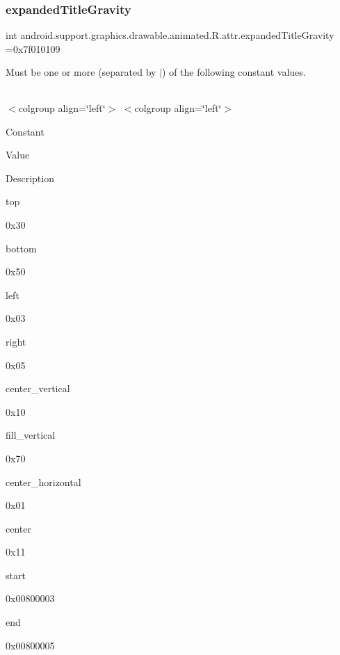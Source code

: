 \subsubsection{\texorpdfstring{expanded\+Title\+Gravity}{expandedTitleGravity}}
{\footnotesize\ttfamily int android.\+support.\+graphics.\+drawable.\+animated.\+R.\+attr.\+expanded\+Title\+Gravity =0x7f010109\hspace{0.3cm}{\ttfamily [static]}}

Must be one or more (separated by \textquotesingle{}$\vert$\textquotesingle{}) of the following constant values.

\tabulinesep=1mm
\begin{longtabu} spread 0pt [c]{*{0}{|X[-1]}|}
\hline
\end{longtabu}
$<$colgroup align=\char`\"{}left\char`\"{}$>$ $<$colgroup align=\char`\"{}left\char`\"{}$>$ 

Constant

Value

Description 

{\ttfamily top}

0x30

{\ttfamily bottom}

0x50

{\ttfamily left}

0x03

{\ttfamily right}

0x05

{\ttfamily center\+\_\+vertical}

0x10

{\ttfamily fill\+\_\+vertical}

0x70

{\ttfamily center\+\_\+horizontal}

0x01

{\ttfamily center}

0x11

{\ttfamily start}

0x00800003

{\ttfamily end}

0x00800005\mbox{\label{classandroid_1_1support_1_1graphics_1_1drawable_1_1animated_1_1R_1_1attr_a2d6b5451a1db0c68014f4fb7a47b06de}} 
